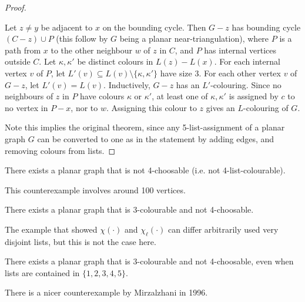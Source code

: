 \documentclass[main.tex]{subfiles}
\begin{document}
\begin{proof}
\begin{subproof}
\begin{itemize}
        Let $z\neq y$ be adjacent to $x$ on the bounding cycle.
        Then $G - z$ has bounding cycle $(C - z)\cup P$ (this follow by $G$
        being a planar near-triangulation), where $P$ is a path
        from $x$ to the other neighbour $w$ of $z$ in $C$, and $P$ has internal
        vertices outside $C$.
        Let $\kappa, \kappa'$ be distinct colours in $L(z) - L(x)$.
        For each internal vertex $v$ of $P$, let
        $L'(v)\subseteq L(v)\setminus\{\kappa,\kappa'\}$ have size 3.
        For each other vertex $v$ of $G - z$, let $L'(v) = L(v)$.
        Inductively, $G - z$ has an $L'$-colouring.
        Since no neighbours of $z$ in $P$ have colours $\kappa$ or $\kappa'$,
        at least one of $\kappa, \kappa'$ is assigned by $c$ to no vertex in
        $P - x$, nor to $w$.
        Assigning this colour to $z$ gives an $L$-colouring of $G$.
        \qedhere
    \end{itemize}
  \end{subproof}
  Note this implies the original theorem, since any 5-list-assignment of a
  planar graph $G$ can be converted to one as in the statement by adding edges,
  and removing colours from lists.
\end{proof}
\begin{theorem}[Voigt 1993]
  There exists a planar graph that is not 4-choosable (i.e. not 4-list-colourable).
\end{theorem}
This counterexample involves around 100 vertices.
\begin{theorem}[Gutner 1996]
  There exists a planar graph that is 3-colourable and not 4-choosable.
\end{theorem}
The example that showed $\chi(\cdot)$ and $\chi_\ell(\cdot)$ can differ
arbitrarily used very disjoint lists, but this is not the case here.
\begin{theorem}
  There exists a planar graph that is 3-colourable and not 4-choosable,
  even when lists are contained in $\{1,2,3,4,5\}$.
\end{theorem}
There is a nicer counterexample by Mirzalzhani in 1996.
\end{document}

